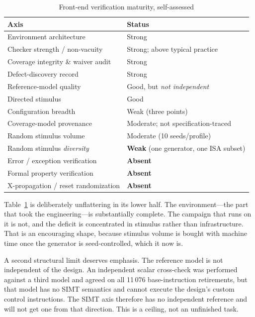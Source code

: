\documentclass[conference]{IEEEtran}
\begin{document}
\begin{table}[t]
\caption{Front-end verification maturity, self-assessed}
\label{tab:maturity}
\centering
\small
\begin{tabular}{ll}
\toprule
Axis & Status \\
\midrule
Environment architecture & Strong \\
Checker strength / non-vacuity & Strong; above typical practice \\
Coverage integrity \& waiver audit & Strong \\
Defect-discovery record & Strong \\
Reference-model quality & Good, but \emph{not independent} \\
Directed stimulus & Good \\
Configuration breadth & Weak (three points) \\
Coverage-model provenance & Moderate; not specification-traced \\
Random stimulus volume & Moderate (10 seeds/profile) \\
Random stimulus \emph{diversity} & \textbf{Weak} (one generator, one ISA subset) \\
Error / exception verification & \textbf{Absent} \\
Formal property verification & \textbf{Absent} \\
X-propagation / reset randomization & \textbf{Absent} \\
\bottomrule
\end{tabular}
\end{table}

Table~\ref{tab:maturity} is deliberately unflattering in its lower half.
The environment---the part that took the engineering---is substantially
complete. The campaign that runs on it is not, and the deficit is
concentrated in stimulus rather than infrastructure. That is an
encouraging shape, because stimulus volume is bought with machine time
once the generator is seed-controlled, which it now is.

A second structural limit deserves emphasis. The reference model is not
independent of the design. An independent scalar cross-check was performed
against a third model and agreed on all 11\,076 base-instruction
retirements, but that model has no SIMT semantics and cannot execute the
design's custom control instructions. The SIMT axis therefore has no
independent reference and will not get one from that direction. This is a
ceiling, not an unfinished task.
\end{document}
